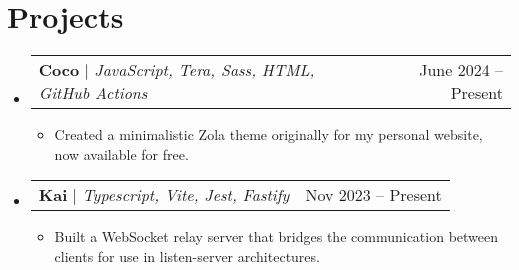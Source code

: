\documentclass[letterpaper,11pt]{article}
\makeatletter
\newcommand{\resumeItem}[1]{
  \item\small{#1}
}
\newcommand{\resumeProjectHeading}[2]{
    \item
    \begin{tabular*}{0.97\textwidth}{l@{\extracolsep{\fill}}r}
      \small#1 & #2 \\
    \end{tabular*}\vspace{-7pt}
}
\newcommand{\resumeSubHeadingListStart}{\begin{itemize}[leftmargin=0.15in, label={}]}
\newcommand{\resumeSubHeadingListEnd}{\end{itemize}}
\newcommand{\resumeItemListStart}{\begin{itemize}}
\newcommand{\resumeItemListEnd}{\end{itemize}}
\makeatother
\begin{document}
\section{Projects}
    \resumeSubHeadingListStart
      \resumeProjectHeading
          {\textbf{Coco} $|$ \emph{JavaScript, Tera, Sass, HTML, GitHub Actions}}{June 2024 -- Present}
          \resumeItemListStart
            \resumeItem{Created a minimalistic Zola theme originally for my personal website, now available for free.}
          \resumeItemListEnd
      \resumeProjectHeading
          {\textbf{Kai} $|$ \emph{Typescript, Vite, Jest, Fastify }}{Nov 2023 -- Present}
          \resumeItemListStart
            \resumeItem{Built a WebSocket relay server that bridges the communication between clients for use in listen-server architectures.}
          \resumeItemListEnd
    \resumeSubHeadingListEnd
\end{document}
